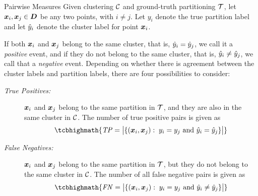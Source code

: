\begin{frame}{Pairwise Measures}
Given clustering ${\mathcal C}$ and ground-truth partitioning ${\mathcal T}$, let
${\boldsymbol x}_i, {\boldsymbol x}_{j} \in {\boldsymbol D}$ be any two points, with $i\ne j$. 
Let $y_i$ denote
the true partition label and let $\hat{y}_i$ denote the cluster label for
point ${\boldsymbol x}_i$.

\medskip
If both ${\boldsymbol x}_i$ and ${\boldsymbol x}_{j}$ belong to the same cluster, that is, $\hat{y}_i =
\hat{y}_{j}$, we call it
a {\em positive} event, and if they do not belong to the same cluster,
that is, $\hat{y}_i \ne \hat{y}_{j}$, we call that a {\em negative} event.
Depending on whether there is agreement between the cluster labels and
partition labels, there are four possibilities to consider:

\begin{description}

\item[\textit{True Positives:}] 
  ${\boldsymbol x}_i$ and ${\boldsymbol x}_{j}$ belong to the same
  partition in ${\mathcal T}$, and they are also in the same cluster in ${\mathcal C}$. The number of true
  positive pairs is given as
  \begin{align*}
\tcbhighmath{
  \mathit{TP} = \bigl|\{(\bx_i, \bx_{j}):\; y_i = y_{j}
  \text{ and } \hy_i = \hy_{j} \}\bigr|
}
  \end{align*}

\item[\textit{False Negatives:}] 
  ${\boldsymbol x}_i$ and ${\boldsymbol x}_{j}$ belong to the same
  partition in ${\mathcal T}$, but they do not belong to the  same cluster in ${\mathcal C}$.
The
  number of all false negative pairs is given as
  \begin{align*}
\tcbhighmath{
  \mathit{FN} = \bigl|\{(\bx_i, \bx_{j}):\; y_i = y_{j}
  \text{ and } \hy_i \ne \hy_{j} \}\bigr|
}
  \end{align*}
\end{description}
\end{frame}

